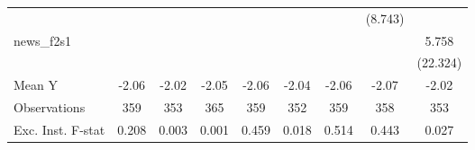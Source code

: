 {\begin{tabular}{l*{8}{c}}
            &                     &                     &                     &                     &                     &                     &     (8.743)         &                     \\
\addlinespace
news\_f2s1   &                     &                     &                     &                     &                     &                     &                     &       5.758         \\
            &                     &                     &                     &                     &                     &                     &                     &    (22.324)         \\
\midrule
Mean Y      &       -2.06         &       -2.02         &       -2.05         &       -2.06         &       -2.04         &       -2.06         &       -2.07         &       -2.02         \\
Observations&         359         &         353         &         365         &         359         &         352         &         359         &         358         &         353         \\
Exc. Inst. F-stat&       0.208         &       0.003         &       0.001         &       0.459         &       0.018         &       0.514         &       0.443         &       0.027         \\
\bottomrule
\end{tabular}
}
